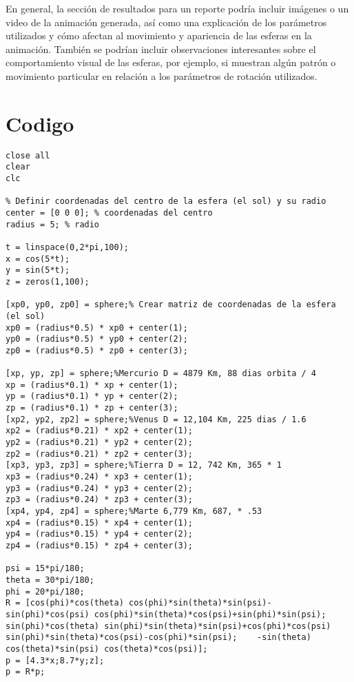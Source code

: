 \documentclass[12pt]{article}
\begin{document}
	En general, la sección de resultados para un reporte podría incluir imágenes o un video de la animación generada, así como una explicación de los parámetros utilizados y cómo afectan al movimiento y apariencia de las esferas en la animación. También se podrían incluir observaciones interesantes sobre el comportamiento visual de las esferas, por ejemplo, si muestran algún patrón o movimiento particular en relación a los parámetros de rotación utilizados.
	
	\section{Codigo}
	
\begin{lstlisting}
close all
clear
clc
	
% Definir coordenadas del centro de la esfera (el sol) y su radio
center = [0 0 0]; % coordenadas del centro
radius = 5; % radio

t = linspace(0,2*pi,100);
x = cos(5*t);
y = sin(5*t);
z = zeros(1,100);

[xp0, yp0, zp0] = sphere;% Crear matriz de coordenadas de la esfera (el sol)
xp0 = (radius*0.5) * xp0 + center(1);
yp0 = (radius*0.5) * yp0 + center(2);
zp0 = (radius*0.5) * zp0 + center(3);

[xp, yp, zp] = sphere;%Mercurio D = 4879 Km, 88 dias orbita / 4
xp = (radius*0.1) * xp + center(1);
yp = (radius*0.1) * yp + center(2);
zp = (radius*0.1) * zp + center(3);
[xp2, yp2, zp2] = sphere;%Venus D = 12,104 Km, 225 dias / 1.6
xp2 = (radius*0.21) * xp2 + center(1);
yp2 = (radius*0.21) * yp2 + center(2);
zp2 = (radius*0.21) * zp2 + center(3);
[xp3, yp3, zp3] = sphere;%Tierra D = 12, 742 Km, 365 * 1
xp3 = (radius*0.24) * xp3 + center(1);
yp3 = (radius*0.24) * yp3 + center(2);
zp3 = (radius*0.24) * zp3 + center(3);
[xp4, yp4, zp4] = sphere;%Marte 6,779 Km, 687, * .53
xp4 = (radius*0.15) * xp4 + center(1);
yp4 = (radius*0.15) * yp4 + center(2);
zp4 = (radius*0.15) * zp4 + center(3);

psi = 15*pi/180;
theta = 30*pi/180;
phi = 20*pi/180;
R = [cos(phi)*cos(theta) cos(phi)*sin(theta)*sin(psi)-sin(phi)*cos(psi) cos(phi)*sin(theta)*cos(psi)+sin(phi)*sin(psi);    sin(phi)*cos(theta) sin(phi)*sin(theta)*sin(psi)+cos(phi)*cos(psi) sin(phi)*sin(theta)*cos(psi)-cos(phi)*sin(psi);    -sin(theta) cos(theta)*sin(psi) cos(theta)*cos(psi)];
p = [4.3*x;8.7*y;z];
p = R*p;


\end{lstlisting}
\end{document}
